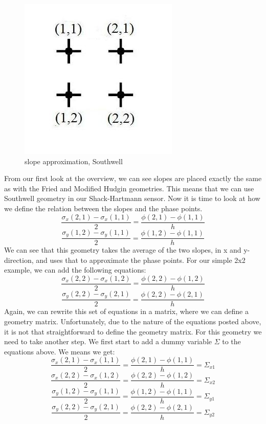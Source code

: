 \documentclass{article}
\begin{document}
\begin{figure}[h!]
  \centering
  \includegraphics[scale=0.6]{figures/southwell}
  \caption{slope approximation, Southwell}
\end{figure}
\noindent From our first look at the overview, we can see slopes are placed exactly the same as with the Fried and Modified Hudgin geometries. This means that we can use Southwell geometry in our Shack-Hartmann sensor. 
\newline
\newline
Now it is time to look at how we define the relation between the slopes and the phase points. 
$$ \frac{\sigma_x(2,1)-\sigma_x(1,1)}{2} = \frac{\phi(2,1)-\phi(1,1)}{h}$$
$$ \frac{\sigma_y(1,2)-\sigma_y(1,1)}{2} = \frac{\phi(1,2)-\phi(1,1)}{h}$$
We can see that this geometry takes the average of the two slopes, in x and y-direction, and uses that to approximate the phase points. For our simple 2x2 example, we can add the following equations:
$$ \frac{\sigma_x(2,2)-\sigma_x(1,2)}{2} = \frac{\phi(2,2)-\phi(1,2)}{h}$$
$$ \frac{\sigma_y(2,2)-\sigma_y(2,1)}{2} = \frac{\phi(2,2)-\phi(2,1)}{h}$$
Again, we can rewrite this set of equations in a matrix, where we can define a geometry matrix. 
Unfortunately, due to the nature of the equations posted above, it is not that straightforward to define the geometry matrix. For this geometry we need to take another step. We first start to add a dummy variable $\varSigma$ to the equations above. We means we get:
$$ \frac{\sigma_x(2,1)-\sigma_x(1,1)}{2} = \frac{\phi(2,1)-\phi(1,1)}{h} = \varSigma_{x1}$$
$$ \frac{\sigma_x(2,2)-\sigma_x(1,2)}{2} = \frac{\phi(2,2)-\phi(1,2)}{h} = \varSigma_{x2}$$
$$ \frac{\sigma_y(1,2)-\sigma_y(1,1)}{2} = \frac{\phi(1,2)-\phi(1,1)}{h} = \varSigma_{y1}$$
$$ \frac{\sigma_y(2,2)-\sigma_y(2,1)}{2} = \frac{\phi(2,2)-\phi(2,1)}{h} = \varSigma_{y2}$$
\end{document}
